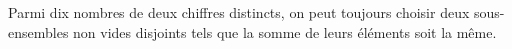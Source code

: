 Parmi dix nombres de deux chiffres distincts, on peut toujours choisir deux
sous-ensembles non vides disjoints tels que la somme de leurs éléments soit
la même.
